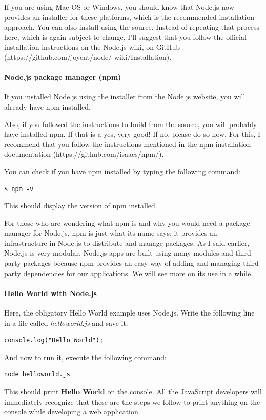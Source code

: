 If you are using Mac OS or Windows, you should know that Node.js now provides
an installer for these platforms, which is the recommended installation approach.
You can also install using the source. Instead of repeating that process here, which
is again subject to change, I'll suggest that you follow the official installation
instructions on the Node.js wiki, on GitHub (https://github.com/joyent/node/
wiki/Installation).

\paragraph*{Node.js package manager (npm)}
\hfill \break
If you installed Node.js using the installer from the Node.js website, you will already
have npm installed.

Also, if you followed the instructions to build from the source, you will probably
have installed npm. If that is a yes, very good! If no, please do so now. For this,
I recommend that you follow the instructions mentioned in the npm installation
documentation (https://github.com/isaacs/npm/).

You can check if you have npm installed by typing the following command:

\begin{lstlisting}
$ npm -v
\end{lstlisting}

This should display the version of npm installed.

For those who are wondering what npm is and why you would need a package
manager for Node.js, npm is just what its name says; it provides an infrastructure
in Node.js to distribute and manage packages. As I said earlier, Node.js is very
modular. Node.js apps are built using many modules and third-party packages
because npm provides an easy way of adding and managing third-party
dependencies for our applications. We will see more on its use in a while.

\paragraph*{Hello World with Node.js}
\hfill \break
Here, the obligatory Hello World example uses Node.js. Write the following line in a
file called \textit{helloworld.js} and save it:
\begin{lstlisting}
console.log("Hello World");
\end{lstlisting}
And now to run it, execute the following command:
\begin{lstlisting}
node helloworld.js
\end{lstlisting}
This should print \textbf{Hello World} on the console. All the JavaScript developers will
immediately recognize that these are the steps we follow to print anything on the
console while developing a web application.

